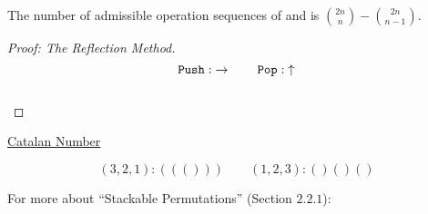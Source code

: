 \begin{frame}{}
  \begin{theorem}
    The number of admissible operation sequences of \texttt{\it {}} and \texttt{\it {}} is ${2n \choose n} - {2n \choose n-1}$.
  \end{theorem}

  \pause
  \begin{proof}[Proof: The Reflection Method]
    \[
      \texttt{Push}{}: \;\rightarrow \qquad \texttt{Pop}{}: \;\uparrow
    \]

    \begin{columns}
      \pause
	\begin{center}
	  \resizebox{0.80\textwidth}{!}{}
	\end{center}
    \end{columns}
  \end{proof}
\end{frame}

\begin{frame}{}
  \begin{center}
    \resizebox{0.60\textwidth}{!}{}
  \end{center}
\end{frame}

\begin{frame}{}
  \begin{center}
    \resizebox{0.60\textwidth}{!}{}
  \end{center}
\end{frame}

\begin{frame}{}
  \centerline{\Large \href{https://en.wikipedia.org/wiki/Catalan\_number}{Catalan Number}}

  \[
    (3,2,1): ((())) \qquad (1,2,3): ()()()
  \]
\end{frame}

\begin{frame}{}
  \centerline{\Large For more about ``Stackable Permutations'' {\large (Section $2.2.1$)}:}

  \vspace{0.30cm}
  \begin{columns}
  \end{columns}
\end{frame}
